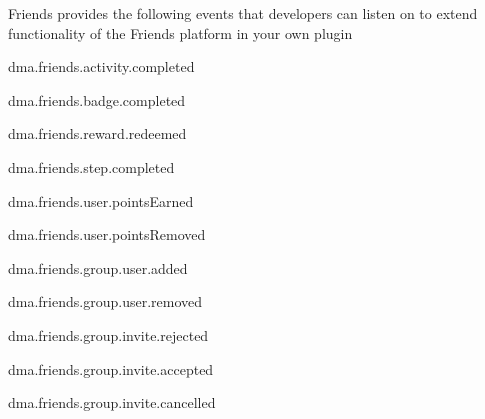 Friends provides the following events that developers can listen on to extend functionality of the Friends platform in your own plugin


\begin{DoxyItemize}
\item dma.\+friends.\+activity.\+completed
\item dma.\+friends.\+badge.\+completed
\item dma.\+friends.\+reward.\+redeemed
\item dma.\+friends.\+step.\+completed
\item dma.\+friends.\+user.\+points\+Earned
\item dma.\+friends.\+user.\+points\+Removed
\item dma.\+friends.\+group.\+user.\+added
\item dma.\+friends.\+group.\+user.\+removed
\item dma.\+friends.\+group.\+invite.\+rejected
\item dma.\+friends.\+group.\+invite.\+accepted
\item dma.\+friends.\+group.\+invite.\+cancelled 
\end{DoxyItemize}